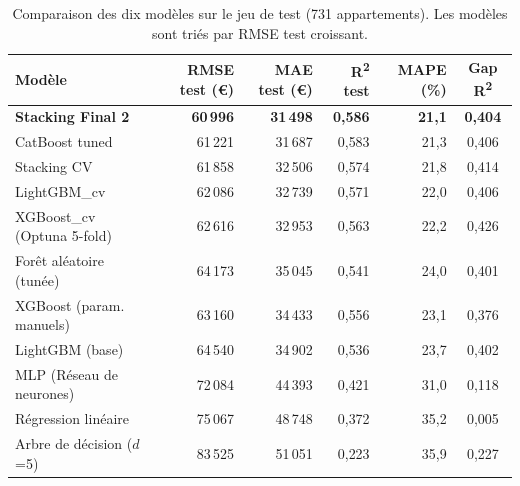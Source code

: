 \documentclass[12pt,a4paper]{article}
\begin{document}
\begin{table}[H]
\centering
\caption{Comparaison des dix mod\`eles sur le jeu de test (731 appartements). Les mod\`eles sont tri\'es par RMSE test croissant.}
\label{tab:comparatif}
\small
\begin{tabular}{lrrrrc}
\toprule
\textbf{Mod\`ele} & \textbf{RMSE test (\euro)} & \textbf{MAE test (\euro)} & \textbf{R\textsuperscript{2} test} & \textbf{MAPE (\%)} & \textbf{Gap R\textsuperscript{2}} \\
\midrule
\textbf{Stacking Final 2}        & \textbf{60\,996} & \textbf{31\,498} & \textbf{0{,}586} & \textbf{21{,}1} & \textbf{0{,}404} \\
CatBoost tuned                   & 61\,221 & 31\,687 & 0{,}583 & 21{,}3 & 0{,}406 \\
Stacking CV                      & 61\,858 & 32\,506 & 0{,}574 & 21{,}8 & 0{,}414 \\
LightGBM\_cv                     & 62\,086 & 32\,739 & 0{,}571 & 22{,}0 & 0{,}406 \\
XGBoost\_cv (Optuna 5-fold)      & 62\,616 & 32\,953 & 0{,}563 & 22{,}2 & 0{,}426 \\
For\^et al\'eatoire (tun\'ee)    & 64\,173 & 35\,045 & 0{,}541 & 24{,}0 & 0{,}401 \\
XGBoost (param. manuels)         & 63\,160 & 34\,433 & 0{,}556 & 23{,}1 & 0{,}376 \\
LightGBM (base)                  & 64\,540 & 34\,902 & 0{,}536 & 23{,}7 & 0{,}402 \\
MLP (R\'eseau de neurones)       & 72\,084 & 44\,393 & 0{,}421 & 31{,}0 & 0{,}118 \\
R\'egression lin\'eaire          & 75\,067 & 48\,748 & 0{,}372 & 35{,}2 & 0{,}005 \\
Arbre de d\'ecision ($d$=5)      & 83\,525 & 51\,051 & 0{,}223 & 35{,}9 & 0{,}227 \\
\bottomrule
\end{tabular}
\end{table}
\end{document}
